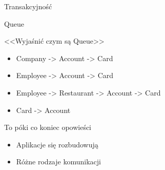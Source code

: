 \documentclass{beamer}
\begin{document}
\begin{frame}{}
	\begin{center}
		\Huge{Transakcyjność}
	\end{center}
\end{frame}

\begin{frame}{}
	\begin{center}
		\Huge{Queue}
	\end{center}
\end{frame}

\begin{frame}{}
	\begin{center}
		\Huge{<<Wyjaśnić czym są Queue>>}
	\end{center}
\end{frame}

\begin{frame}{}
	\begin{huge}
		\begin{itemize}[<+->]
			\item Company -> Account -> Card
			\item Employee -> Account -> Card
		\end{itemize}
	\end{huge}
\end{frame}

\begin{frame}{}
	\begin{huge}
		\begin{itemize}[<+->]
			\item Employee -> Restaurant -> Account -> Card
			\item Card -> Account
		\end{itemize}
	\end{huge}
\end{frame}


\begin{frame}{}
	\begin{center}
		\Huge{To póki co koniec opowieści}
	\end{center}
\end{frame}

\begin{frame}{}
	\begin{huge}
		\begin{itemize}[<+->]
			\item Aplikacje się rozbudowują
			\item Różne rodzaje komunikacji
		\end{itemize}
	\end{huge}
\end{frame}
\end{document}
